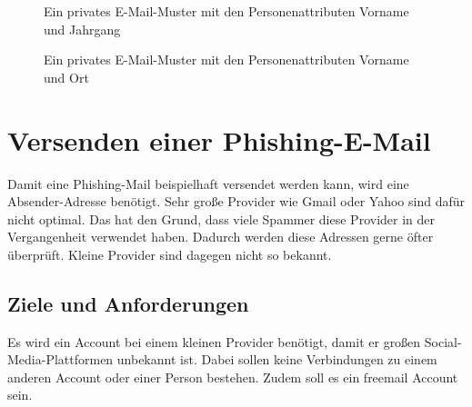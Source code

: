 			\begin{figure}[h!]
				\caption{Ein privates E-Mail-Muster mit den Personenattributen Vorname und Jahrgang}
				\label{img:VornameJahrgang}
			\end{figure}
		
			\begin{figure}[h!]
				\caption{Ein privates E-Mail-Muster mit den Personenattributen Vorname und Ort}
			\end{figure}
		
		\FloatBarrier
\section{Versenden einer Phishing-E-Mail}
Damit eine Phishing-Mail beispielhaft versendet werden kann, wird eine Absender-Adresse benötigt. Sehr große Provider wie Gmail oder Yahoo sind dafür nicht optimal. Das hat den Grund, dass viele Spammer diese Provider in der Vergangenheit verwendet haben. Dadurch werden diese Adressen gerne öfter überprüft. Kleine Provider sind dagegen nicht so bekannt.\cite{Bazzell}
	\subsection{Ziele und Anforderungen}
	Es wird ein Account bei einem kleinen Provider benötigt, damit er großen Social-Media-Plattformen unbekannt ist. Dabei sollen keine Verbindungen zu einem anderen Account oder einer Person bestehen. Zudem soll es ein freemail Account sein.
